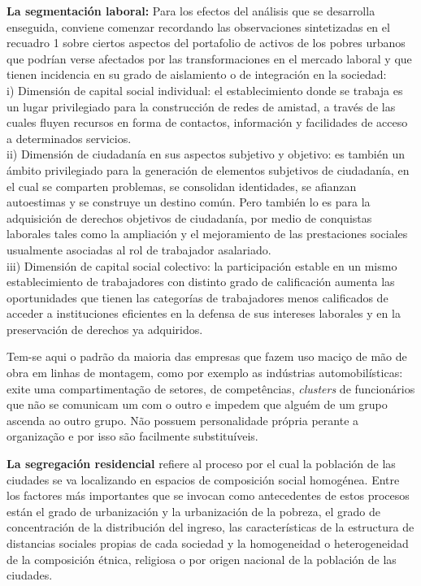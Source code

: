 \documentclass[
	12pt,				%
	openright,			%
	twoside,			%
	a4paper,			%
	chapter=TITLE,		%
	section=TITLE,		%
	subsection=TITLE,	%
	subsubsection=TITLE,%
	spanish,            %
	english,			%
	brazil				%
	]{abntex2}
\begin{document}
\begin{citacao}[spanish]
\textbf{La segmentación laboral:} Para los efectos del análisis que se desarrolla enseguida, conviene comenzar recordando las observaciones
sintetizadas en el recuadro 1 sobre ciertos aspectos del portafolio de activos de los pobres urbanos que podrían
verse afectados por las transformaciones en el mercado laboral y que tienen incidencia en su grado de aislamiento o de integración en la sociedad:\\
i) Dimensión de capital social individual: el establecimiento donde se trabaja es un lugar privilegiado
para la construcción de redes de amistad, a través de las cuales fluyen recursos en forma de contactos, información y facilidades de acceso a determinados servicios.\\
ii) Dimensión de ciudadanía en sus aspectos subjetivo y objetivo: es también un ámbito privilegiado para la generación de elementos subjetivos de ciudadanía, en el cual se comparten problemas, se consolidan identidades, se afianzan autoestimas y se construye un destino común. Pero también lo es para la adquisición de derechos objetivos de ciudadanía, por medio de conquistas laborales tales como la ampliación y el mejoramiento de las prestaciones sociales usualmente asociadas al rol de trabajador asalariado.\\
iii) Dimensión de capital social colectivo: la participación estable en un mismo establecimiento de trabajadores con distinto grado de calificación aumenta las oportunidades que tienen las categorías de trabajadores menos calificados de acceder a instituciones eficientes en la defensa de sus intereses laborales y en la preservación de derechos ya adquiridos.\cite[p. ~174-745]{Katzman}
\end{citacao}
\par
Tem-se aqui o padrão da maioria das empresas que fazem uso maciço de mão de obra em linhas de montagem, como por exemplo as indústrias automobilísticas: exite uma compartimentação de setores, de competências, \textit{clusters} de funcionários que não se comunicam um com o outro e impedem que alguém de um grupo ascenda ao outro grupo. Não possuem personalidade própria perante a organização e por isso são facilmente substituíveis.
\begin{citacao}[spanish]
\textbf{La segregación residencial} refiere al proceso por el cual la población de las ciudades se va localizando en espacios de composición social homogénea. Entre los factores más importantes que se invocan como antecedentes de estos procesos están el grado de urbanización y la urbanización de la pobreza, el grado de concentración de la distribución del ingreso, las características de la estructura de distancias sociales propias de cada sociedad y la homogeneidad o heterogeneidad de la composición étnica, religiosa o por origen nacional de la población de las ciudades.\cite[p. ~79]{Katzman}
\end{citacao}
\end{document}
